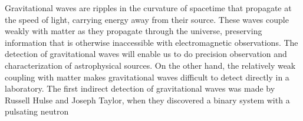 \newcommand{\FILL}{\textcolor{red}{FILLME}}



Gravitational waves
are ripples in the curvature of spacetime that propagate at the speed of light,
% 
% 
carrying energy away from their source. These waves couple weakly with matter as 
they propagate through the universe, 
preserving information that is otherwise inaccessible with electromagnetic 
observations. The detection of gravitational waves will enable 
us to do precision observation and characterization of astrophysical sources. 
On the other hand, the relatively weak coupling with matter makes gravitational
waves difficult to detect directly in a laboratory.
The first indirect detection of gravitational waves was made by Russell Hulse 
and Joseph Taylor, when they discovered a binary system with a pulsating neutron
